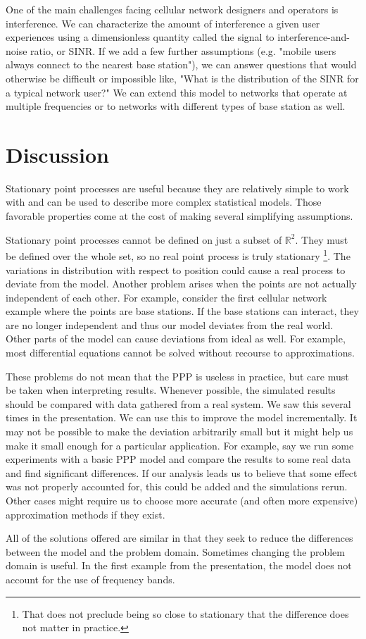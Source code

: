 \documentclass[]{article}
\begin{document}
One of the main challenges facing cellular network designers and operators is interference. We can characterize the amount of interference a given user experiences using a dimensionless quantity called the signal to interference-and-noise ratio, or SINR. If we add a few further assumptions (e.g. "mobile users always connect to the nearest base station"), we can answer questions that would otherwise be difficult or impossible like, "What is the distribution of the SINR for a typical network user?" We can extend this model to networks that operate at multiple frequencies or to networks with different types of base station as well.

\section{Discussion}
Stationary point processes are useful because they are relatively simple to work with and can be used to describe more complex statistical models. Those favorable properties come at the cost of making several simplifying assumptions.

Stationary point processes cannot be defined on just a subset of $\mathbb{R}^2$. They must be defined over the whole set, so no real point process is truly stationary \footnote{That does not preclude being so close to stationary that the difference does not matter in practice.}. The variations in distribution with respect to position could cause a real process to deviate from the model. Another problem arises when the points are not actually independent of each other. For example, consider the first cellular network example where the points are base stations. If the base stations can interact, they are no longer independent and thus our model deviates from the real world. Other parts of the model can cause deviations from ideal as well. For example, most differential equations cannot be solved without recourse to approximations.

These problems do not mean that the PPP is useless in practice, but care must be taken when interpreting results. Whenever possible, the simulated results should be compared with data gathered from a real system. We saw this several times in the presentation. We can use this to improve the model incrementally. It may not be possible to make the deviation arbitrarily small but it might help us make it small enough for a particular application. For example, say we run some experiments with a basic PPP model and compare the results to some real data and find significant differences. If our analysis leads us to believe that some effect was not properly accounted for, this could be added and the simulations rerun. Other cases might require us to choose more accurate (and often more expensive) approximation methods if they exist.

All of the solutions offered are similar in that they seek to reduce the differences between the model and the problem domain. Sometimes changing the problem domain is useful. In the first example from the presentation, the model does not account for the use of frequency bands. 
\nocite{kham}
\nocite{randv}
\nocite{ppp}
\nocite{poissond}


\end{document}
